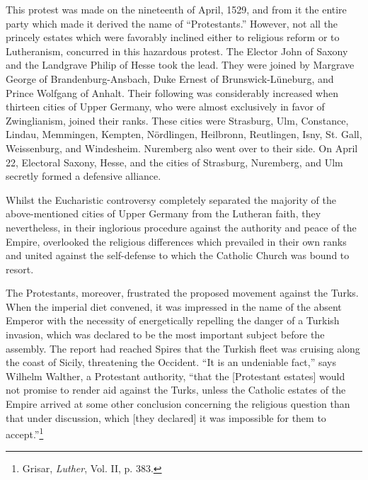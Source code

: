 This protest was made on the nineteenth of April, 1529, and from
it the entire party which made it derived the name of “Protestants.”
However, not all the princely estates which were favorably inclined
either to religious reform or to Lutheranism, concurred in this
hazardous protest. The Elector John of Saxony and the Landgrave
Philip of Hesse took the lead. They were joined by Margrave George
of Brandenburg-Ansbach, Duke Ernest of Brunswick-Lüneburg,
and Prince Wolfgang of Anhalt. Their following was considerably
increased when thirteen cities of Upper Germany, who were almost
exclusively in favor of Zwinglianism, joined their ranks. These cities
were Strasburg, Ulm, Constance, Lindau, Memmingen, Kempten,
Nördlingen, Heilbronn, Reutlingen, Isny, St. Gall, Weissenburg, and
Windesheim. Nuremberg also went over to their side. On April 22,
Electoral Saxony, Hesse, and the cities of Strasburg, Nuremberg, and
Ulm secretly formed a defensive alliance.

Whilst the Eucharistic controversy completely separated the
majority of the above-mentioned cities of Upper Germany from
the Lutheran faith, they nevertheless, in their inglorious procedure
against the authority and peace of the Empire, overlooked the religious
differences which prevailed in their own ranks and united against the
self-defense to which the Catholic Church was bound to resort.

The Protestants, moreover, frustrated the proposed movement
against the Turks. When the imperial diet convened, it was impressed in
the name of the absent Emperor with the necessity of
energetically repelling the danger of a Turkish invasion, which was
declared to be the most important subject before the assembly. The report
had reached Spires that the Turkish fleet was cruising along the
coast of Sicily, threatening the Occident. “It is an undeniable fact,”
says Wilhelm Walther, a Protestant authority, “that the [Protestant
estates] would not promise to render aid against the Turks, unless the
Catholic estates of the Empire arrived at some other conclusion concerning
the religious question than that under discussion, which [they
declared] it was impossible for them to accept.”\footnote{Grisar, \textit{Luther}, Vol. II, p. 383.}

